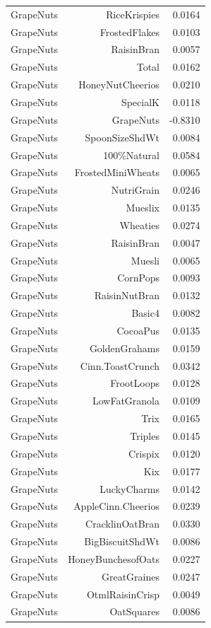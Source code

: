 \begin{longtable}{@{}lrr@{}}
GrapeNuts & RiceKrispies & 0.0164 \\
GrapeNuts & FrostedFlakes & 0.0103 \\
GrapeNuts & RaisinBran & 0.0057 \\
GrapeNuts & Total & 0.0162 \\
GrapeNuts & HoneyNutCheerios & 0.0210 \\
GrapeNuts & SpecialK & 0.0118 \\
GrapeNuts & GrapeNuts & -0.8310 \\
GrapeNuts & SpoonSizeShdWt & 0.0084 \\
GrapeNuts & 100\%Natural & 0.0584 \\
GrapeNuts & FrostedMiniWheats & 0.0065 \\
GrapeNuts & NutriGrain & 0.0246 \\
GrapeNuts & Mueslix & 0.0135 \\
GrapeNuts & Wheaties & 0.0274 \\
GrapeNuts & RaisinBran & 0.0047 \\
GrapeNuts & Muesli & 0.0065 \\
GrapeNuts & CornPops & 0.0093 \\
GrapeNuts & RaisinNutBran & 0.0132 \\
GrapeNuts & Basic4 & 0.0082 \\
GrapeNuts & CocoaPus & 0.0135 \\
GrapeNuts & GoldenGrahams & 0.0159 \\
GrapeNuts & Cinn.ToastCrunch & 0.0342 \\
GrapeNuts & FrootLoops & 0.0128 \\
GrapeNuts & LowFatGranola & 0.0109 \\
GrapeNuts & Trix & 0.0165 \\
GrapeNuts & Triples & 0.0145 \\
GrapeNuts & Crispix & 0.0120 \\
GrapeNuts & Kix & 0.0177 \\
GrapeNuts & LuckyCharms & 0.0142 \\
GrapeNuts & AppleCinn.Cheerios & 0.0239 \\
GrapeNuts & CracklinOatBran & 0.0330 \\
GrapeNuts & BigBiscuitShdWt & 0.0086 \\
GrapeNuts & HoneyBunchesofOats & 0.0227 \\
GrapeNuts & GreatGraines & 0.0247 \\
GrapeNuts & OtmlRaisinCrisp & 0.0049 \\
GrapeNuts & OatSquares & 0.0086 \\

\end{longtable}
